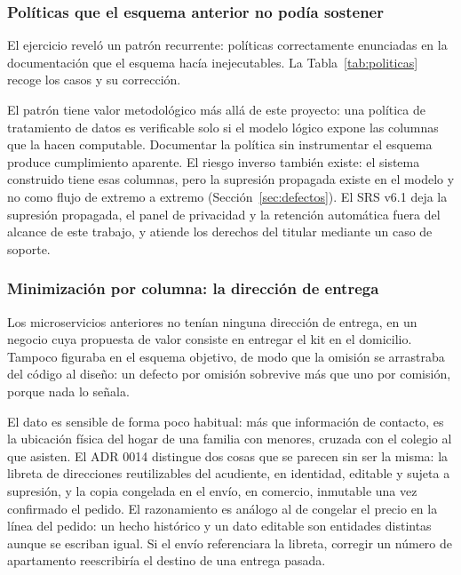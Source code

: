 \subsubsection{Políticas que el esquema anterior no podía sostener}

El ejercicio reveló un patrón recurrente: políticas correctamente enunciadas en la
documentación que el esquema hacía inejecutables. La Tabla~\ref{tab:politicas} recoge los
casos y su corrección.



El patrón tiene valor metodológico más allá de este proyecto: una política de tratamiento
de datos es verificable solo si el modelo lógico expone las columnas que la hacen
computable. Documentar la política sin instrumentar el esquema produce cumplimiento
aparente. El riesgo inverso también existe: el sistema construido tiene esas columnas, pero
la supresión propagada existe en el modelo y no como flujo de extremo a extremo
(Sección~\ref{sec:defectos}). El SRS v6.1 deja la supresión propagada, el panel de privacidad
y la retención automática fuera del alcance de este trabajo, y atiende los derechos del
titular mediante un caso de soporte.

\subsubsection{Minimización por columna: la dirección de entrega}

Los microservicios anteriores no tenían ninguna dirección de entrega, en un negocio cuya
propuesta de valor consiste en entregar el kit en el domicilio. Tampoco figuraba en el
esquema objetivo, de modo que la omisión se arrastraba del código al diseño: un defecto por
omisión sobrevive más que uno por comisión, porque nada lo señala.

El dato es sensible de forma poco habitual: más que información de contacto, es la
ubicación física del hogar de una familia con menores, cruzada con el colegio al que
asisten. El ADR 0014 distingue dos cosas que se parecen sin ser la misma: la libreta de
direcciones reutilizables del acudiente, en identidad, editable y sujeta a supresión, y la
copia congelada en el envío, en comercio, inmutable una vez confirmado el pedido. El
razonamiento es análogo al de congelar el precio en la línea del pedido: un hecho histórico
y un dato editable son entidades distintas aunque se escriban igual. Si el envío
referenciara la libreta, corregir un número de apartamento reescribiría el destino de una
entrega pasada.

